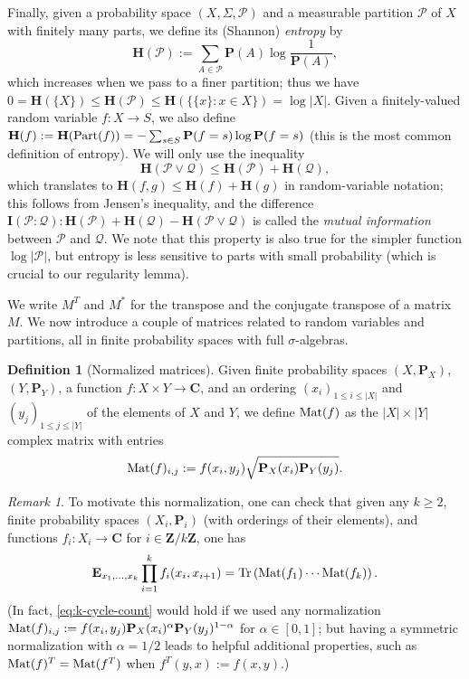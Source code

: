 \documentclass[reqno,11pt]{amsart}
\theoremstyle{definition}
\newtheorem{definition}[theorem]{Definition}
\theoremstyle{remark}
\newtheorem*{remark}{Remark}
\numberwithin{equation}{section}
\newcommand{\Z}{\mathbf{Z}}
\newcommand{\C}{\mathbf{C}}
\renewcommand{\P}{\mathbf{P}}
\renewcommand{\H}{\mathbf{H}}
\newcommand{\I}{\mathbf{I}}
\newcommand{\E}{\mathbf{E}}
\newcommand{\mP}{\mathcal{P}}
\newcommand{\mQ}{\mathcal{Q}}
\newcommand{\Tr}{\textnormal{Tr}}
\newcommand{\Mat}{\textnormal{Mat}}
\newcommand{\Part}{\textnormal{Part}}
\begin{document}
Finally, given a probability space $(X, \Sigma, \mP)$ and a measurable partition $\mP$ of $X$ with finitely many parts, we define its (Shannon) \emph{entropy} by
\[
    \H(\mP) := \sum_{A \in \mP} \P(A) \log \frac{1}{\P(A)},
\]
which increases when we pass to a finer partition; thus we have $0 = \H(\{X\}) \le \H(\mP) \le \H(\{\{x\} : x \in X\}) = \log |X|$. Given a finitely-valued random variable $f : X \to S$, we also define $\H(f) := \H(\Part(f)) = - \sum_{s \in S} \P(f = s) \log \P(f = s)$ (this is the most common definition of entropy). We will only use the inequality
\begin{equation} \label{eq:entropy-inequalities}
    \H(\mP \vee \mQ) \le \H(\mP) + \H(\mQ),
\end{equation}
which translates to $\H(f, g) \le \H(f) + \H(g)$ in random-variable notation; this follows from Jensen's inequality, and the difference $\I(\mP : \mQ) : \H(\mP) + \H(\mQ) - \H(\mP \vee \mQ)$ is called the \emph{mutual information} between $\mP$ and $\mQ$. We note that this property is also true for the simpler function $\log |\mP|$, but entropy is less sensitive to parts with small probability (which is crucial to our regularity lemma).

We write $M^T$ and $M^*$ for the transpose and the conjugate transpose of a matrix $M$. We now introduce a couple of matrices related to random variables and partitions, all in finite probability spaces with full $\sigma$-algebras.

\begin{definition}[Normalized matrices] \label{def:matrices}
Given finite probability spaces $(X, \P_X)$, $(Y, \P_Y)$, a function $f : X \times Y \to \C$, and an ordering $(x_i)_{1 \le i \le |X|}$ and $(y_j)_{1 \le j \le |Y|}$ of the elements of $X$ and $Y$, we define $\Mat(f)$ as the $|X| \times |Y|$ complex matrix with entries
\[
    \Mat(f)_{i,j} := f(x_i, y_j) \sqrt{\P_X(x_i) \P_Y(y_j)}.
\]
\end{definition}

\begin{remark}
To motivate this normalization, one can check that given any $k \ge 2$, finite probability spaces $(X_i, \P_i)$ (with orderings of their elements), and functions $f_i : X_i \to \C$ for $i \in \Z/k\Z$, one has
\begin{equation} \label{eq:k-cycle-count}
    \E_{x_1, \ldots, x_k} \prod_{i=1}^k f_i(x_i, x_{i+1}) = \Tr\left(\Mat(f_1)\cdots \Mat(f_k) \right).
\end{equation}
(In fact, \cref{eq:k-cycle-count} would hold if we used any normalization $\Mat(f)_{i,j} := f(x_i, y_j) \P_X(x_i)^\alpha \P_Y(y_j)^{1-\alpha}$ for $\alpha \in [0, 1]$; but having a symmetric normalization with $\alpha = 1/2$ leads to helpful additional properties, such as $\Mat(f)^T = \Mat(f^T)$ when $f^T(y, x) := f(x, y)$.)
\end{remark}
\end{document}
